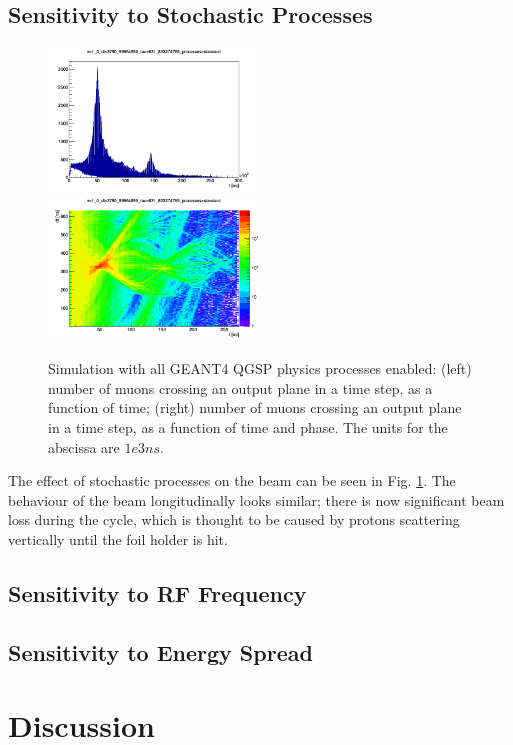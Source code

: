 \documentclass{paper}
\begin{document}
\subsection{Sensitivity to Stochastic Processes}

\begin{figure}
		\includegraphics[width=0.5\textwidth]{images/beam_monitor_v=1_0_dt=3790_99964859_tau=631_833274765_processes=standard}
		\includegraphics[width=0.5\textwidth]{images/time_vs_dt_v=1_0_dt=3790_99964859_tau=631_833274765_processes=standard}
	\caption{Simulation with all GEANT4 QGSP physics processes enabled: (left)
           number of muons crossing an output plane in a time step, as a 
           function of time; (right) number of muons crossing an output plane in
           a time step, as a function of time and phase. The 
           units for the abscissa are $1e3 ns$.}
	\label{fig:mc_stochastic processes}
\end{figure}

The effect of stochastic processes on the beam can be seen in Fig. 
\ref{fig:mc_stochastic processes}. The behaviour of the beam longitudinally
looks similar; there is now significant beam loss during the cycle,
which is thought to be caused by protons scattering vertically until the foil 
holder is hit.

\subsection{Sensitivity to RF Frequency}


\subsection{Sensitivity to Energy Spread}


\section{Discussion}
\end{document}
